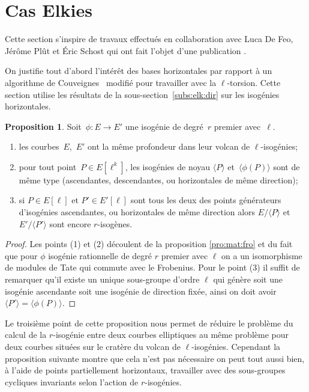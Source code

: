 \documentclass[10pt,a4paper]{book}
\theoremstyle{plain}
\theoremstyle{definition}
\theoremstyle{definition}
\theoremstyle{definition}
\newtheorem{prop}[thm]{Proposition}
\theoremstyle{definition}
\theoremstyle{remark}
\theoremstyle{remark}
\theoremstyle{definition}
\begin{document}
\section{Cas Elkies}
\label{sec:cou:elk}
 Cette section s'inspire de travaux effectués en collaboration avec Luca De Feo,
J\'er\^ome Pl\^ut et \'Eric Schost qui ont fait l'objet d'une publication 
\cite{Defeo_Plut_Schost_2016}. 

On justifie tout d'abord l'intérêt des bases horizontales par rapport à un 
algorithme de Couveignes~\cite{Couveignes96} modifié pour travailler avec la
$\ell$-torsion. Cette section utilise les résultats de la 
sous-section~\ref{subs:elk:dir} sur les isogénies horizontales.

\begin{prop}\label{pro:par:iso}
Soit~$\phi: E \rightarrow E'$ une isogénie de degré~$r$ premier avec~$\ell$.
\begin{enumerate}
\item les courbes~$E$,~$E'$ ont la même profondeur dans leur volcan de
 $\ell$-isogénies;
\item\label{pro:par:fun} pour tout point~$P \in E[\ell^k]$,
les isogénies de noyau $\langle P \rangle$ et~$\langle \phi(P) \rangle$ sont de même type
(ascendantes, descendantes, ou horizontales de même direction);
\item\label{pro:par:asc} si $P \in E[\ell]$ et $P' \in E'[\ell]$ sont tous les 
deux des points générateurs d'isogénies ascendantes, ou horizontales de même 
direction alors $E/\langle P \rangle$ et~$E'/\langle P' \rangle$ sont encore $r$-isogènes.
\end{enumerate}
\end{prop}

\begin{proof}
Les points (1) et (2) découlent de la proposition \ref{pro:mat:fro} et du fait que pour $\phi$ isogénie rationnelle de degré $r$ premier avec $\ell$ on a un isomorphisme de modules de Tate qui commute avec le Frobenius. Pour le point (3) il suffit de remarquer qu'il existe un unique sous-groupe d'ordre $\ell$ qui génère soit une isogénie ascendante soit une isogénie de direction fixée, ainsi on doit avoir $\langle P' \rangle=\langle \phi(P) \rangle$.

\end{proof}
Le troisième point de cette proposition nous permet de réduire le problème du 
calcul de la $r$-isogénie entre deux courbes elliptiques au même problème pour 
deux courbes situées sur le cratère du volcan de $\ell$-isogénies. Cependant la
proposition suivante montre que cela n'est pas nécessaire on peut tout aussi 
bien, à l'aide de points partiellement horizontaux, travailler avec des 
sous-groupes cycliques invariants selon l'action de $r$-isogénies. 
\end{document}

